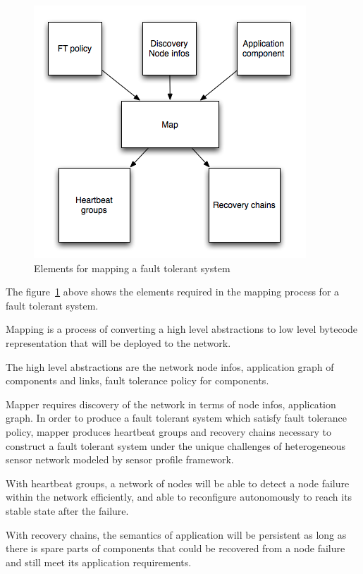 \begin{figure}[h!]
\label{fig:mapping-ft}
\caption{Elements for mapping a fault tolerant system}
\centering
    \includegraphics[width=\linewidth]{figures/mapping-ft}
\end{figure}

The figure~\ref{fig:mapping-ft} above shows the elements required in the
mapping process for a fault tolerant system.

Mapping is a process of converting a high level abstractions to low level
bytecode representation that will be deployed to the network.

The high level abstractions are the network node infos, application graph of
components and links, fault tolerance policy for components.

Mapper requires discovery of the network in terms of node infos, application
graph. In order to produce a fault tolerant system which satisfy fault
tolerance policy, mapper produces heartbeat groups and recovery chains
necessary to construct a fault tolerant system under the unique challenges of
heterogeneous sensor network modeled by sensor profile framework.

With heartbeat groups, a network of nodes will be able to detect a node failure
within the network efficiently, and able to reconfigure autonomously to reach
its stable state after the failure.

With recovery chains, the semantics of application will be persistent as
long as there is spare parts of components that could be recovered from
a node failure and still meet its application requirements.

